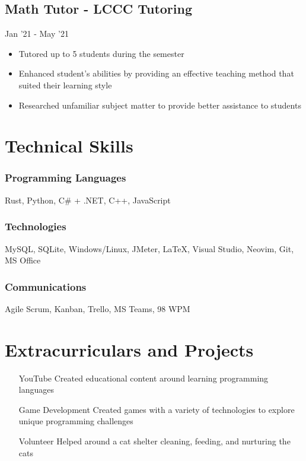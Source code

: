 \documentclass{article}
\begin{document}
\subsection{Math Tutor - LCCC Tutoring} \hfill Jan '21 - May '21
\begin{itemize}
  \item Tutored up to 5 students during the semester
  \item Enhanced student’s abilities by providing an effective teaching method that suited their learning style
  \item Researched unfamiliar subject matter to provide better assistance to students
\end{itemize}

\section{Technical Skills}

\subsubsection{Programming Languages} Rust, Python, C\# + .NET, C++, JavaScript

\subsubsection{Technologies} MySQL, SQLite, Windows/Linux, JMeter, {\LaTeX}, Visual Studio, Neovim, Git, MS Office

\subsubsection{Communications} Agile Scrum, Kanban, Trello, MS Teams,  98 WPM

\section{Extracurriculars and Projects}
\begin{itemize}
  \item[YouTube] Created educational content around learning programming languages
  \item[Game Development] Created games with a variety of technologies to explore unique programming challenges
  \item[Volunteer] Helped around a cat shelter cleaning, feeding, and nurturing the cats
\end{itemize}

\thispagestyle{empty}
\end{document}
